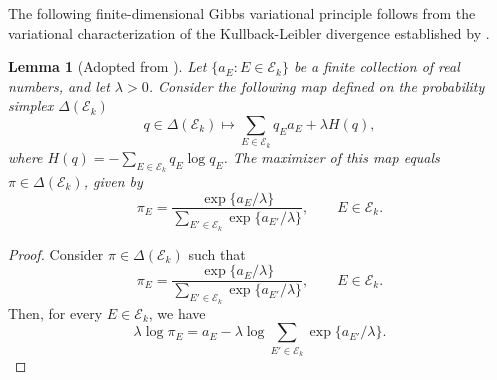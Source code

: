 \documentclass[12pt]{article}
\newtheorem{lemma}[theorem]{Lemma}
\newcommand{\Pp}{{\mathbb{P}}}
\newcommand{\Ee}{{\mathbb{E}}}
\newcommand{\Ek}{\mathcal{E}_{k}}      %
\newcommand{\Ehat}{\widehat{E}}
\newcommand{\Estar}{\widehat{W}^*}
\begin{document}
\begin{appendices}

The following finite-dimensional Gibbs variational principle follows from
the variational characterization of the Kullback-Leibler divergence 
established by \cite{Csiszar1975}.

\begin{lemma}[Adopted from \cite{Csiszar1975}]
\label{lem:gibbs-variational}
Let $\{a_E:E\in\Ek\}$ be a finite collection of real numbers, and let
$\lambda>0$. 
Consider the following map defined on the probability simplex $\Delta(\Ek)$
\[
  q\in\Delta(\Ek) \mapsto \sum_{E\in\Ek}q_Ea_E+\lambda H(q),
\]
where $H(q)=-\sum_{E\in\Ek}q_E\log q_E$.
The maximizer of this map equals $\pi \in \Delta(\Ek)$, given by
\[
  \pi_E
  =
  \frac{\exp\{a_E/\lambda\}}
       {\sum_{E'\in\Ek}\exp\{a_{E'}/\lambda\}},
  \qquad E\in\Ek .
\]

\end{lemma}

\begin{proof}
Consider $\pi \in \Delta(\Ek)$ such that
\[
  \pi_E
  =
  \frac{\exp\{a_E/\lambda\}}
       {\sum_{E'\in\Ek}\exp\{a_{E'}/\lambda\}},
  \qquad E\in\Ek.
\]
Then, for every $E\in\Ek$, we have
\begin{equation}
  \lambda\log\pi_E
  = a_E - \lambda\log\sum_{E'\in\Ek}\exp\{a_{E'}/\lambda\}.
  \label{eqn: identity:pi}
\end{equation}


\end{proof}
\end{appendices}
\end{document}
